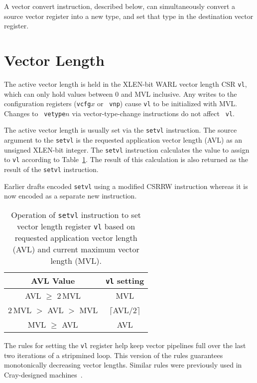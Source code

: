 A vector convert instruction, described below, can simultaneously
convert a source vector register into a new type, and set that type in
the destination vector register.

\section{Vector Length}

The active vector length is held in the XLEN-bit WARL vector length
CSR {\tt vl}, which can only hold values between 0 and MVL inclusive.
Any writes to the configuration registers ({\tt vcfg}$x$ or {\tt
  vnp}) cause {\tt vl} to be initialized with MVL. Changes to {\tt
  vetype}$n$ via vector-type-change instructions do not affect {\tt
  vl}.

The active vector length is usually set via the {\tt setvl}
instruction.  The source argument to the {\tt setvl} is the requested
application vector length (AVL) as an unsigned XLEN-bit integer. The
{\tt setvl} instruction calculates the value to assign to {\tt vl}
according to Table~\ref{tab:vlcalc}.  The result of this calculation
is also returned as the result of the {\tt setvl} instruction.

\begin{commentary}
Earlier drafts encoded {\tt setvl} using a modified CSRRW instruction
whereas it is now encoded as a separate new instruction.
\end{commentary}

\begin{table}
  \centering
  \begin{tabular}{|c|c|}
    \hline
    AVL Value & {\tt vl} setting \\
    \hline
    AVL $\geq$ 2\,MVL & MVL \\
    2\,MVL $>$ AVL $>$ MVL & $\lceil$AVL$/2\rceil$ \\
    MVL $\geq$ AVL & AVL \\
    \hline
  \end{tabular}
  \caption{Operation of {\tt setvl} instruction to set vector
    length register {\tt vl} based on requested application vector
    length (AVL) and current maximum vector length (MVL).}
  \label{tab:vlcalc}
\end{table}

\begin{commentary}
  The rules for setting the {\tt vl} register help keep vector
  pipelines full over the last two iterations of a stripmined loop.
  This version of the rules guarantees monotonically decreasing vector
  lengths. 
  Similar rules were previously used in Cray-designed machines~\cite{crayx1asm}.
\end{commentary}

